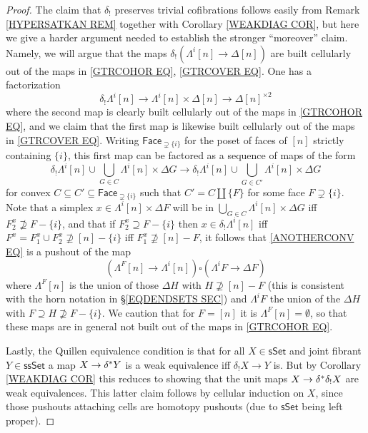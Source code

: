 \documentclass[a4paper,10pt
,draft
]{article}%
\begin{document}
\begin{proof}
The claim that $\delta_!$ preserves trivial cofibrations follows easily from Remark \ref{HYPERSATKAN REM} together with Corollary \ref{WEAKDIAG COR}, but here we give a harder argument needed to establish the stronger ``moreover'' claim.
Namely, we will argue that the maps
$\delta_! \left( \Lambda^i[n] \to \Delta[n]\right)$
are built cellularly out of the maps in 
\eqref{GTRCOHOR EQ}, \eqref{GTRCOVER EQ}.
One has a factorization
\[
	\delta_! \Lambda^i[n] \to
	\Lambda^i[n] \times \Delta[n] \to \Delta[n]^{\times 2}
\]
where the second map is clearly built cellularly out of the maps in 
\eqref{GTRCOHOR EQ}, and we claim that 
the first map is likewise built cellularly out of the maps in \eqref{GTRCOVER EQ}.
Writing $\mathsf{Face}_{\supsetneq \{i\}}$ for the poset
of faces of $[n]$ strictly containing $\{i\}$, this first map 
can be factored as a sequence of maps of the form
\begin{equation}\label{ANOTHERCONV EQ}
\delta_! \Lambda^i[n] \cup \bigcup_{G \in C} \Lambda^i[n] \times \Delta G
\to
\delta_! \Lambda^i[n] \cup \bigcup_{G \in C'} \Lambda^i[n] \times \Delta G
\end{equation}
for convex
$C \subseteq C' \subseteq \mathsf{Face}_{\supsetneq \{i\}}$ such that $C' = C \amalg \{F\}$ for some face $F\supsetneq \{i\}$.
Note that a simplex 
$x \in \Lambda^i[n] \times \Delta F$
will be in $\bigcup_{G \in C} \Lambda^i[n] \times \Delta G$ iff 
$F_2^x \not \supseteq F-\{i\}$, 
and that if 
$F_2^x \supseteq F-\{i\}$
then $x \in \delta_! \Lambda^i[n]$ 
iff $F^x=F_1^x \cup F_2^x \not \supseteq [n] - \{i\}$
iff $F_1^x \not \supseteq [n] - F$,
it follows that \eqref{ANOTHERCONV EQ} is a pushout of the map
\begin{equation}\label{LAMBDAFPUSH EQ}
	\left(\Lambda^{F}[n] \to \Lambda^i[n] \right)
		\square
	\left(\Lambda^{i}F \to \Delta F \right)
\end{equation}
where $\Lambda^{F}[n]$ is the union of those $\Delta H$ with $H \not \supseteq [n] - F$ (this is consistent with the horn notation in \S \ref{EQDENDSETS SEC})
and $\Lambda^i F$ the union of the $\Delta H$ with $F \supseteq H \not \supseteq F - \{i\}$.
We caution that for $F=[n]$ it is $\Lambda^F[n]=\emptyset$, so that these maps are in general not built out of the maps in \eqref{GTRCOHOR EQ}. 


Lastly, the Quillen equivalence condition 
is that for all $X \in \mathsf{sSet}$ and joint fibrant
$Y \in \mathsf{ssSet}$ a map
$X \to \delta^{\**} Y$ is a weak equivalence iff 
$\delta_!X \to Y$ is. 
But by Corollary \ref{WEAKDIAG COR}
this reduces to showing
that the unit maps $X \to \delta^{\**} \delta_! X$
are weak equivalences. This latter claim follows by cellular induction on $X$, since those pushouts attaching cells are homotopy pushouts (due to $\mathsf{sSet}$ being left proper).
\end{proof}
\end{document}
